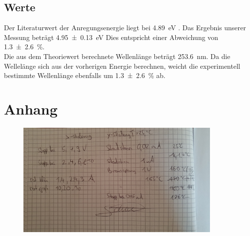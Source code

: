 \subsection{Werte}

Der Literaturwert der Anregungsenergie liegt bei \qty{4.89}{\electronvolt} \cite{HG_Energie}. Das Ergebnis unserer Messung beträgt 
\qty{4.95\pm0.13}{\electronvolt} Dies entspricht einer Abweichung von \qty{1.3\pm2.6}{\percent}.\\
Die aus dem Theoriewert berechnete Wellenlänge beträgt \qty{253.6}{\nano\meter}. Da die Wellelänge sich aus der vorherigen Energie berechnen, 
weicht die experimentell bestimmte Wellenlänge ebenfalls um \qty{1.3\pm2.6}{\percent} ab.    

\section{Anhang}

\begin{figure}
    \centering
    \includegraphics[width=0.9\textwidth]{content/Laborbuch.jpg}
\end{figure}

%
